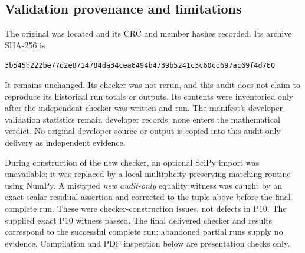 \documentclass[11pt]{article}
\begin{document}
\subsection{Validation provenance and limitations}
The original  was located and its CRC and
member hashes recorded. Its archive SHA-256 is
\begin{center}\small
\nolinkurl{3b545b222be77d2e8714784da34cea6494b4739b5241c3c60cd697ac69f4d760}
\end{center}
It remains unchanged. Its checker was not rerun, and this audit does not
claim to reproduce its historical run totals or outputs. Its contents were
inventoried only after the independent checker was written and run. The
manifest's developer-validation statistics remain developer records; none
enters the mathematical verdict. No original developer source or output is
copied into this audit-only delivery as independent evidence.

During construction of the new checker, an optional SciPy import was
unavailable; it was replaced by a local multiplicity-preserving matching
routine using NumPy. A mistyped \emph{new audit-only} equality witness was
caught by an exact scalar-residual assertion and corrected to the tuple
above before the final complete run. These were checker-construction issues,
not defects in P10. The supplied exact P10 witness passed. The final delivered
checker and results correspond to the successful complete run; abandoned
partial runs supply no evidence. Compilation and PDF inspection below are
presentation checks only.
\end{document}
